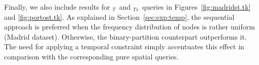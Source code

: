 	Finally, we also include results for \topK$_T$\ and \topK$_{Ts}$\ queries in Figures~\ref{fig:madridst.tk} and \ref{fig:portost.tk}. 
	As explained in Section~\ref{sec:exp:temp}, the sequential approach is preferred when the frequency distribution of nodes is
	rather uniform (Madrid dataset). Otherwise, the binary-partition counterpart outperforms it. The need for applying a temporal
	constraint simply accentuates this effect in comparison with the corresponding pure spatial queries.



